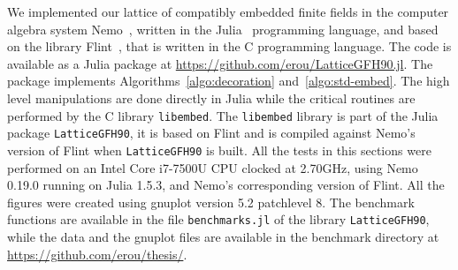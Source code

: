We implemented our lattice of compatibly embedded finite fields in the computer
algebra system Nemo~\cite{Nemo}, written in the Julia~\cite{Julia} programming
language, and based on the library Flint~\cite{Flint}, that is written in the C
programming language. The code is available as a Julia package at
\url{https://github.com/erou/LatticeGFH90.jl}. The package implements
Algorithms~\ref{algo:decoration} and~\ref{algo:std-embed}. The high level
manipulations are done directly in Julia while the critical routines are
performed by the C library \texttt{libembed}. The \texttt{libembed} library is
part of the Julia package \texttt{LatticeGFH90}, it is based on Flint and is
compiled against Nemo's version of Flint when \texttt{LatticeGFH90} is built.
All the tests in this sections were performed on an
Intel Core i7-7500U CPU clocked at 2.70GHz, using Nemo 0.19.0 running on
Julia 1.5.3, and Nemo’s corresponding version of Flint. All the figures were
created using gnuplot version 5.2 patchlevel 8. The benchmark functions are
available in the file \texttt{benchmarks.jl} of the library
\texttt{LatticeGFH90}, while the data and the gnuplot files are available in the
benchmark directory at \url{https://github.com/erou/thesis/}.

